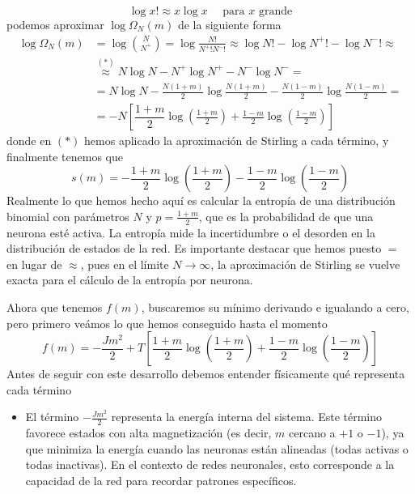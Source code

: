 \begin{description}
\begin{equation*}
        \log x! \approx x \log x \quad \text{ para } x \text{ grande}
    \end{equation*}
    podemos aproximar $\log \Omega_N(m)$ de la siguiente forma
    \begin{align*}
        \log \Omega_N(m) &= \log \binom{N}{N^+} = \log \frac{N!}{N^+! N^-!} \approx \log N! - \log N^+! - \log N^-! \approx \\
        &\overset{(*)}{\approx} N \log N - N^+ \log N^+ - N^- \log N^- =\\
        & = N \log N - \frac{N(1+m)}{2} \log \frac{N(1+m)}{2} - \frac{N(1-m)}{2} \log \frac{N(1-m)}{2} = \\
        &= -N \left[ \dfrac{1+m}{2} \log \left(\frac{1+m}{2}\right) + \frac{1-m}{2} \log \left(\frac{1-m}{2}\right) \right] 
    \end{align*}
    donde en $(*)$ hemos aplicado la aproximación de Stirling a cada término, y finalmente tenemos que
    \begin{equation*}
        s(m) = -\dfrac{1+m}{2} \log \left(\frac{1+m}{2}\right) - \frac{1-m}{2} \log \left(\frac{1-m}{2}\right)  
    \end{equation*}
    Realmente lo que hemos hecho aquí es calcular la entropía de una distribución binomial con parámetros $N$ y $p = \frac{1+m}{2}$, que es la probabilidad de que una neurona esté activa. La entropía mide la incertidumbre o el desorden en la distribución de estados de la red. Es importante destacar que hemos puesto $=$ en lugar de $\approx$, pues en el límite $N \to \infty$, la aproximación de Stirling se vuelve exacta para el cálculo de la entropía por neurona. \\
    \item [Extremización de $f(m)$.] Ahora que tenemos $f(m)$, buscaremos su mínimo derivando e igualando a cero, pero primero veámos lo que hemos conseguido hasta el momento
    \begin{equation*}
        f(m) = -\frac{Jm^2}{2} + T \left[ \dfrac{1+m}{2} \log \left(\frac{1+m}{2}\right) + \frac{1-m}{2} \log \left(\frac{1-m}{2}\right) \right]
    \end{equation*}
    Antes de seguir con este desarrollo debemos entender físicamente qué representa cada término
    \begin{itemize}
        \item El término $-\frac{Jm^2}{2}$ representa la energía interna del sistema. Este término favorece estados con alta magnetización (es decir, $m$ cercano a $+1$ o $-1$), ya que minimiza la energía cuando las neuronas están alineadas (todas activas o todas inactivas). En el contexto de redes neuronales, esto corresponde a la capacidad de la red para recordar patrones específicos.

\end{itemize}
\end{description}
